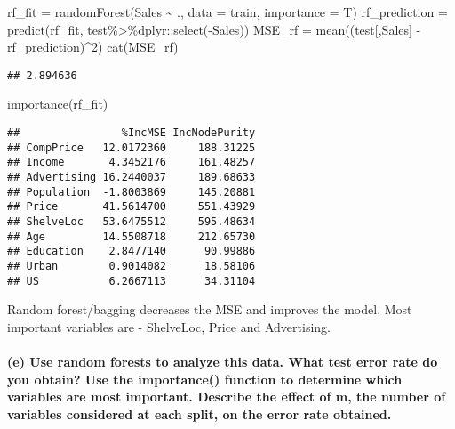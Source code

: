 \documentclass[
]{article}
\newenvironment{Shaded}{\begin{snugshade}}{\end{snugshade}}
\newcommand{\AttributeTok}[1]{\textcolor[rgb]{0.77,0.63,0.00}{#1}}
\newcommand{\DecValTok}[1]{\textcolor[rgb]{0.00,0.00,0.81}{#1}}
\newcommand{\FunctionTok}[1]{\textcolor[rgb]{0.00,0.00,0.00}{#1}}
\newcommand{\NormalTok}[1]{#1}
\newcommand{\OtherTok}[1]{\textcolor[rgb]{0.56,0.35,0.01}{#1}}
\newcommand{\SpecialCharTok}[1]{\textcolor[rgb]{0.00,0.00,0.00}{#1}}
\newcommand{\StringTok}[1]{\textcolor[rgb]{0.31,0.60,0.02}{#1}}
\begin{document}
\begin{Shaded}
\begin{Highlighting}[]
\NormalTok{rf\_fit }\OtherTok{=} \FunctionTok{randomForest}\NormalTok{(Sales }\SpecialCharTok{\textasciitilde{}}\NormalTok{ ., }\AttributeTok{data =}\NormalTok{ train, }\AttributeTok{importance =}\NormalTok{ T)}
\NormalTok{rf\_prediction }\OtherTok{=} \FunctionTok{predict}\NormalTok{(rf\_fit, test}\SpecialCharTok{\%\textgreater{}\%}\NormalTok{dplyr}\SpecialCharTok{::}\FunctionTok{select}\NormalTok{(}\SpecialCharTok{{-}}\NormalTok{Sales))}
\NormalTok{MSE\_rf }\OtherTok{=} \FunctionTok{mean}\NormalTok{((test[,}\StringTok{\textquotesingle{}Sales\textquotesingle{}}\NormalTok{] }\SpecialCharTok{{-}}\NormalTok{ rf\_prediction)}\SpecialCharTok{\^{}}\DecValTok{2}\NormalTok{)}
\FunctionTok{cat}\NormalTok{(MSE\_rf)}
\end{Highlighting}
\end{Shaded}

\begin{verbatim}
## 2.894636
\end{verbatim}

\begin{Shaded}
\begin{Highlighting}[]
\FunctionTok{importance}\NormalTok{(rf\_fit)}
\end{Highlighting}
\end{Shaded}

\begin{verbatim}
##                %IncMSE IncNodePurity
## CompPrice   12.0172360     188.31225
## Income       4.3452176     161.48257
## Advertising 16.2440037     189.68633
## Population  -1.8003869     145.20881
## Price       41.5614700     551.43929
## ShelveLoc   53.6475512     595.48634
## Age         14.5508718     212.65730
## Education    2.8477140      90.99886
## Urban        0.9014082      18.58106
## US           6.2667113      34.31104
\end{verbatim}

Random forest/bagging decreases the MSE and improves the model. Most
important variables are - ShelveLoc, Price and Advertising.

\hypertarget{e-use-random-forests-to-analyze-this-data.-what-test-error-rate-do-you-obtain-use-the-importance-function-to-determine-which-variables-are-most-important.-describe-the-effect-of-m-the-number-of-variables-considered-at-each-split-on-the-error-rate-obtained.}{%
\paragraph{(e) Use random forests to analyze this data. What test error
rate do you obtain? Use the importance() function to determine which
variables are most important. Describe the effect of m, the number of
variables considered at each split, on the error rate
obtained.}\label{e-use-random-forests-to-analyze-this-data.-what-test-error-rate-do-you-obtain-use-the-importance-function-to-determine-which-variables-are-most-important.-describe-the-effect-of-m-the-number-of-variables-considered-at-each-split-on-the-error-rate-obtained.}}
\end{document}
